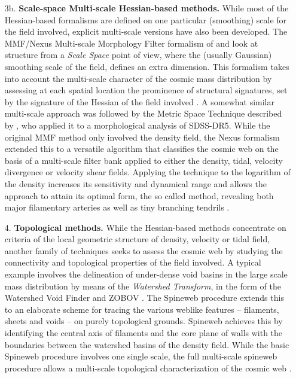 \begin{itemize}
\item[3b.] {\bf Scale-space Multi-scale Hessian-based methods.} While most of the Hessian-based formalisms are defined 
on one particular (smoothing) scale for the field involved, explicit multi-scale versions have also been developed. 
The MMF/Nexus Multi-scale Morphology Filter formalism of \cite{Aragon-Calvo2007} and \cite{Cautun2013}  look at structure from a {\it Scale Space} point of view, where the  (usually Gaussian) smoothing scale of the field, defines an extra dimension.
This formalism takes into account the multi-scale character of the 
cosmic mass distribution by assessing at each spatial location the prominence of structural signatures, set by the signature of the Hessian of 
the field involved \citep{Aragon-Calvo2007,Cautun2013}. A somewhat similar multi-scale approach was followed by the Metric Space Technique described 
by \cite{Wu2009}, who applied it to a morphological analysis of SDSS-DR5.  While the original MMF method \citep{Aragon-Calvo2007} only 
involved the density field, the Nexus formalism extended this to a versatile algorithm that classifies the cosmic web on the basis 
of a multi-scale filter bank applied to  either the density, tidal, velocity divergence or velocity shear fields. Applying the technique to the logarithm of the density increases its sensitivity and dynamical range and allows the approach to attain its optimal form, the so called \nexus{} method, revealing both major filamentary arteries as 
well as tiny branching tendrils \citep{Cautun2013}. 

\item[4.] {\bf Topological methods.} While the Hessian-based methods concentrate on criteria of the local geometric structure of density, 
velocity or tidal field, another family of techniques seeks to assess the cosmic web by studying the connectivity and topological 
properties of the field involved. A typical example involves the delineation of under-dense void basins in the large scale mass 
distribution by means of the {\it Watershed Transform}, in the form of the Watershed Void Finder \citep{Platen2007} and ZOBOV 
\citep{Neyrinck2008}. The Spineweb procedure \citep{Aragon-Calvo2010a} extends this to an elaborate scheme for tracing the various 
weblike features -- filaments, sheets and voids -- on purely topological grounds. Spineweb achieves this by identifying the 
central axis of filaments and the core plane of walls with the boundaries between the watershed basins of the density field. 
While the basic Spineweb procedure involves one single scale, the full multi-scale spineweb procedure allows a multi-scale topological 
characterization of the cosmic web \citep{Aragon-Calvo2010,Aragon-Calvo2010a}. 


\end{itemize}
